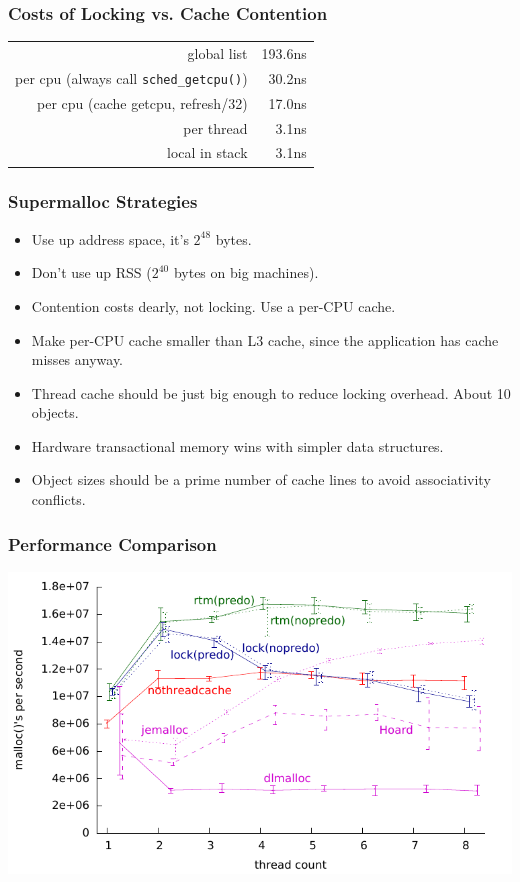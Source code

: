 \documentclass[xcolor=dvipsnames,14pt]{beamer}
\begin{document}
\begin{frame}
\frametitle{Costs of Locking vs. Cache Contention}

\begin{tabular}{rr}
                                                     global list &    193.6ns \\
            per cpu (always call \texttt{sched_getcpu()})  &     30.2ns \\
per cpu (cache getcpu, refresh/32) &     17.0ns \\
                                                      per thread &      3.1ns \\
                                                  local in stack &      3.1ns \\
\end{tabular}
\end{frame}

\begin{frame}
\frametitle{Supermalloc Strategies}

\begin{itemize}
\item Use up address space, it's $2^{48}$ bytes.
\item Don't use up RSS ($2^{40}$ bytes on big machines).
\item Contention costs dearly, not locking.  Use a per-CPU cache.
\item Make per-CPU cache smaller than L3 cache, since the application
  has cache misses anyway.
\item Thread cache should be just big enough to reduce locking overhead.  About 10 objects.
\item Hardware transactional memory wins with simpler data structures.
\item Object sizes should be a prime number of cache lines to avoid associativity conflicts.
\end{itemize}
\end{frame}


\begin{frame}
\frametitle{Performance Comparison}
\hspace*{-.7cm}\includegraphics{new-malloc-test-1K-aggregated.pdf}
\end{frame}
\end{document}
